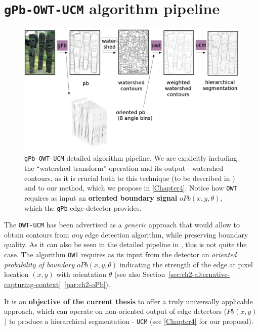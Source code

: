 \section{{\tt gPb-OWT-UCM} algorithm pipeline}
\begin{figure}[t]
\centering
 \includegraphics[width=1\textwidth]{images/gPb-OWT-UCM/gPb-OWT-UCM_pipeline.png}
\caption[{\tt gPb-OWT-UCM} detailed pipeline]{{\tt gPb-OWT-UCM} detailed algorithm pipeline. We are explicitly including the ``watershed transform'' operation and its output - watershed contours, as it is crucial both to this technique (to be described in ) and to our method, which we propose in \cref{Chapter4}. Notice how {\tt OWT} requires as input an {\bf oriented boundary signal} $oPb(x,y,\theta)$, which the {\tt gPb} edge detector provides.}
\label{fig:gPb-OWT-UCM-pipeline}
\end{figure}

The {\tt OWT-UCM} has been advertised \cite{Arbelaez09} as a {\it generic} approach that would allow to obtain contours from {\it any} edge detection algorithm, while preserving boundary quality. As it can also be seen in the detailed pipeline in , this is not quite the case. %
The algorithm {\tt OWT} requires as its input from the detector %
an {\it oriented probability of boundary} $oPb(x,y,\theta)$ indicating the strength of the edge at pixel location $(x,y)$ with orientation $\theta$ (see also Section~\ref*{sec:ch2-alternative-capturing-context}~\ref{par:ch2-oPb}).

It is an {\bf objective of the current thesis} to offer a truly universally applicable approach, which can operate on non-oriented output of edge detectors ($Pb(x,y)$) to produce a hierarchical segmentation - {\tt UCM} (see \cref{Chapter4} for %
our proposal).

